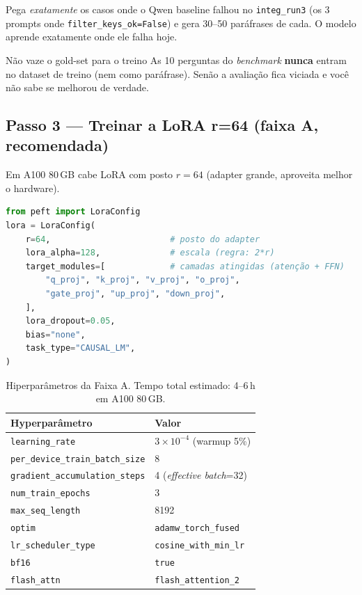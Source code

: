 \documentclass[11pt,a4paper]{article}
\newcommand{\code}[1]{\texttt{\small #1}}
\begin{document}
Pega \emph{exatamente} os casos onde o Qwen baseline falhou no
\code{integ\_run3} (os 3 prompts onde \code{filter\_keys\_ok=False})
e gera 30--50 paráfrases de cada. O modelo aprende exatamente onde
ele falha hoje.

\begin{atencao}{Não vaze o gold-set para o treino}
As 10 perguntas do \emph{benchmark} \textbf{nunca} entram no dataset
de treino (nem como paráfrase). Senão a avaliação fica viciada e
você não sabe se melhorou de verdade.
\end{atencao}

\subsection{Passo 3 --- Treinar a LoRA r=64 (faixa A, recomendada)}

Em A100 80\,GB cabe LoRA com posto $r=64$ (adapter grande,
aproveita melhor o hardware).

\begin{lstlisting}[language=Python,caption={Config LoRA via PEFT.}]
from peft import LoraConfig
lora = LoraConfig(
    r=64,                        # posto do adapter
    lora_alpha=128,              # escala (regra: 2*r)
    target_modules=[             # camadas atingidas (atenção + FFN)
        "q_proj", "k_proj", "v_proj", "o_proj",
        "gate_proj", "up_proj", "down_proj",
    ],
    lora_dropout=0.05,
    bias="none",
    task_type="CAUSAL_LM",
)
\end{lstlisting}

\begin{table}[h!]
\centering
\small
\begin{tabular}{@{}l l@{}}
\toprule
\textbf{Hyperparâmetro} & \textbf{Valor} \\
\midrule
\code{learning\_rate}                  & $3 \times 10^{-4}$ (warmup 5\%) \\
\code{per\_device\_train\_batch\_size} & 8 \\
\code{gradient\_accumulation\_steps}   & 4 (\emph{effective batch}=32) \\
\code{num\_train\_epochs}              & 3 \\
\code{max\_seq\_length}                & 8192 \\
\code{optim}                           & \code{adamw\_torch\_fused} \\
\code{lr\_scheduler\_type}             & \code{cosine\_with\_min\_lr} \\
\code{bf16}                            & \code{true} \\
\code{flash\_attn}                     & \code{flash\_attention\_2} \\
\bottomrule
\end{tabular}
\caption{Hiperparâmetros da Faixa A. Tempo total estimado: 4--6\,h em
A100 80\,GB.}
\end{table}
\end{document}
